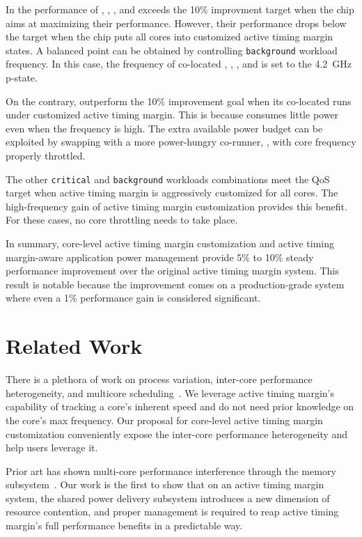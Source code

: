 In  the performance of , , , and  exceeds the 10\% improvment target when the chip aims at maximizing their performance. However, their performance drops below the target when the chip puts all cores into customized active timing margin states. A balanced point can be obtained by controlling \texttt{background} workload frequency. In this case, the frequency of co-located , , , and  is set to the 4.2~GHz p-state.

On the contrary,  outperform the 10\% improvement goal when its co-located  runs under customized active timing margin. This is because  consumes little power even when the frequency is high. The extra available power budget can be exploited by swapping  with a more power-hungry co-runner, , with core frequency properly throttled. 

The other \texttt{critical} and \texttt{background} workloads combinations meet the QoS target when active timing margin is aggressively customized for all cores. The high-frequency gain of active timing margin customization provides this benefit. For these cases, no core throttling needs to take place.

In summary, core-level active timing margin customization and active timing margin-aware application power management provide 5\% to 10\% steady performance improvement over the original active timing margin system. This result is notable because the improvement comes on a production-grade system where even a 1\% performance gain is considered significant.

\section{Related Work}
\label{sec:process:related}

There is a plethora of work on process variation, inter-core performance heterogeneity, and multicore scheduling~\cite{liang2007process,sarangi2008varius,teodorescu2008variation,rangan2009thread,dighe2010within,rangan2011achieving}. We leverage active timing margin's capability of tracking a core's inherent speed and do not need prior knowledge on the core's max frequency. Our proposal for core-level active timing margin customization conveniently expose the inter-core performance heterogeneity and help users leverage it.

Prior art has shown multi-core performance interference through the memory subsystem~\cite{mars11micro,tang11isca,delimitrou2014quasar,lo2015heracles,verma2015large,llull2017cooper}. Our work is the first to show that on an active timing margin system, the shared power delivery subsystem introduces a new dimension of resource contention, and proper management is required to reap active timing margin's full performance benefits in a predictable way.

